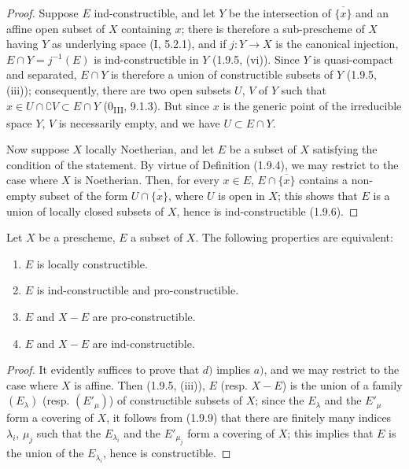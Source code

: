 \begin{proof}
Suppose $E$ ind-constructible, and let $Y$ be the intersection of
$\overline{\{x\}}$ and an affine open subset of $X$ containing $x$; there is
therefore a sub-prescheme of $X$ having $Y$ as underlying space (I, 5.2.1),
and if $j:Y\to X$ is the canonical injection,
$E\cap Y=j^{-1}(E)$ is ind-constructible in $Y$ (1.9.5, (vi)). Since $Y$
is quasi-compact and separated, $E\cap Y$ is therefore a union of
constructible subsets of $Y$ (1.9.5, (iii)); consequently, there are two
open subsets $U$, $V$ of $Y$ such that
$x\in U\cap\complement V\subset E\cap Y$ (0\textsubscript{III}, 9.1.3).
But since $x$ is the generic point of the irreducible space $Y$, $V$ is
necessarily empty, and we have $U\subset E\cap Y$.

Now suppose $X$ locally Noetherian, and let $E$ be a subset of
$X$ satisfying the condition of the statement. By virtue of Definition
(1.9.4), we may restrict to the case where $X$ is Noetherian. Then, for every
$x\in E$, $E\cap\overline{\{x\}}$ contains a non-empty subset of the form
$U\cap\overline{\{x\}}$, where $U$ is open in $X$; this shows that $E$
is a union of locally closed subsets of $X$, hence is
ind-constructible (1.9.6).
\end{proof}

\begin{proposition}[1.9.11]
\label{IV.1.9.11}
Let $X$ be a prescheme, $E$ a subset of $X$. The following properties are
equivalent:
\begin{enumerate}
  \item[a)] $E$ is locally constructible.
  \item[b)] $E$ is ind-constructible and pro-constructible.
  \item[c)] $E$ and $X-E$ are pro-constructible.
  \item[d)] $E$ and $X-E$ are ind-constructible.
\end{enumerate}
\end{proposition}

\begin{proof}
It evidently suffices to prove that $d)$ implies $a)$, and we may restrict
to the case where $X$ is affine. Then (1.9.5, (iii)), $E$ (resp. $X-E$) is
the union of a family $(E_\lambda)$ (resp. $(E'_\mu)$) of constructible
subsets of $X$; since the $E_\lambda$ and the $E'_\mu$ form a covering of
$X$, it follows from (1.9.9) that there are finitely many indices
$\lambda_i$, $\mu_j$ such that the $E_{\lambda_i}$ and the $E'_{\mu_j}$ form
a covering of $X$; this implies that $E$ is the union of the
$E_{\lambda_i}$, hence is constructible.
\end{proof}

